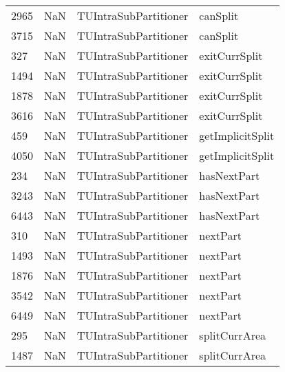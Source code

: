\begin{tabular}{llll}
2965 &                   NaN &      TUIntraSubPartitioner &                                  canSplit \\
3715 &                   NaN &      TUIntraSubPartitioner &                                  canSplit \\
327  &                   NaN &      TUIntraSubPartitioner &                             exitCurrSplit \\
1494 &                   NaN &      TUIntraSubPartitioner &                             exitCurrSplit \\
1878 &                   NaN &      TUIntraSubPartitioner &                             exitCurrSplit \\
3616 &                   NaN &      TUIntraSubPartitioner &                             exitCurrSplit \\
459  &                   NaN &      TUIntraSubPartitioner &                          getImplicitSplit \\
4050 &                   NaN &      TUIntraSubPartitioner &                          getImplicitSplit \\
234  &                   NaN &      TUIntraSubPartitioner &                               hasNextPart \\
3243 &                   NaN &      TUIntraSubPartitioner &                               hasNextPart \\
6443 &                   NaN &      TUIntraSubPartitioner &                               hasNextPart \\
310  &                   NaN &      TUIntraSubPartitioner &                                  nextPart \\
1493 &                   NaN &      TUIntraSubPartitioner &                                  nextPart \\
1876 &                   NaN &      TUIntraSubPartitioner &                                  nextPart \\
3542 &                   NaN &      TUIntraSubPartitioner &                                  nextPart \\
6449 &                   NaN &      TUIntraSubPartitioner &                                  nextPart \\
295  &                   NaN &      TUIntraSubPartitioner &                             splitCurrArea \\
1487 &                   NaN &      TUIntraSubPartitioner &                             splitCurrArea \\

\end{tabular}

